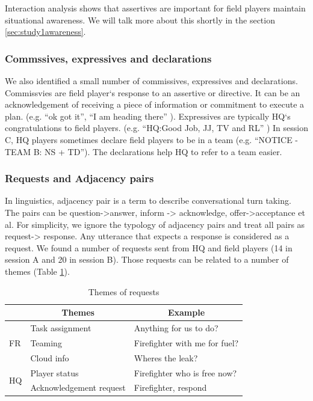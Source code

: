 Interaction analysis shows that assertives are important for field players maintain situational awareness. We will talk more about this shortly in the section \ref{sec:study1awareness}.\\

\subsubsection{Commssives, expressives and declarations}
We also identified a small number of commissives, expressives and declarations. Commissvies are field player`s response to an assertive or directive. It can be an acknowledgement of receiving a piece of information or commitment to execute a plan. (e.g. ``ok got it'', ``I am heading there'' ). Expressives are typically HQ`s congratulations to field players. (e.g. ``HQ:Good Job, JJ, TV and RL'' ) In session C, HQ players sometimes declare field players to be in a team (e.g. ``NOTICE - TEAM B: NS + TD''). The declarations help HQ to refer to a team easier.\\

\subsubsection{Requests and Adjacency pairs}
In linguistics, adjacency pair is a term to describe conversational turn taking. The pairs can be question->answer, inform -> acknowledge, offer->acceptance et al. For simplicity, we ignore the typology of adjacency pairs and treat all pairs as request-> response. Any utterance that expects a response is considered as a request. We found a number of requests sent from HQ and field players (14 in session A and 20 in session B). Those requests can be related to a number of themes (Table \ref{tab:requestThemes}).\\

\begin{table}[h]
\footnotesize
\begin{tabular}{l|ll}
                    & \multicolumn{1}{c}{Themes} & \multicolumn{1}{c}{Example}   \\ \hline
\multirow{3}{*}{FR} & Task assignment            & Anything for us to do?        \\
                    & Teaming                    & Firefighter with me for fuel? \\
                    & Cloud info                 & Wheres the leak?              \\ \hline
\multirow{2}{*}{HQ} & Player status              & Firefighter who is free now?  \\
                    & Acknowledgement request    & Firefighter, respond         
\end{tabular}
\caption{Themes of requests}
\label{tab:requestThemes}
\end{table}

